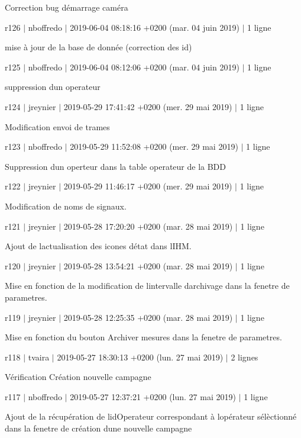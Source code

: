 Correction bug démarrage caméra

r126 $\vert$ nboffredo $\vert$ 2019-\/06-\/04 08\+:18\+:16 +0200 (mar. 04 juin 2019) $\vert$ 1 ligne

mise à jour de la base de donnée (correction des id)

r125 $\vert$ nboffredo $\vert$ 2019-\/06-\/04 08\+:12\+:06 +0200 (mar. 04 juin 2019) $\vert$ 1 ligne

suppression d\textquotesingle{}un operateur

r124 $\vert$ jreynier $\vert$ 2019-\/05-\/29 17\+:41\+:42 +0200 (mer. 29 mai 2019) $\vert$ 1 ligne

Modification envoi de trames

r123 $\vert$ nboffredo $\vert$ 2019-\/05-\/29 11\+:52\+:08 +0200 (mer. 29 mai 2019) $\vert$ 1 ligne

Suppression d\textquotesingle{}un operteur dans la table operateur de la B\+DD

r122 $\vert$ jreynier $\vert$ 2019-\/05-\/29 11\+:46\+:17 +0200 (mer. 29 mai 2019) $\vert$ 1 ligne

Modification de noms de signaux.

r121 $\vert$ jreynier $\vert$ 2019-\/05-\/28 17\+:20\+:20 +0200 (mar. 28 mai 2019) $\vert$ 1 ligne

Ajout de l\textquotesingle{}actualisation des icones d\textquotesingle{}état dans l\textquotesingle{}I\+HM.

r120 $\vert$ jreynier $\vert$ 2019-\/05-\/28 13\+:54\+:21 +0200 (mar. 28 mai 2019) $\vert$ 1 ligne

Mise en fonction de la modification de l\textquotesingle{}intervalle d\textquotesingle{}archivage dans la fenetre de parametres.

r119 $\vert$ jreynier $\vert$ 2019-\/05-\/28 12\+:25\+:35 +0200 (mar. 28 mai 2019) $\vert$ 1 ligne

Mise en fonction du bouton Archiver mesures dans la fenetre de parametres.

r118 $\vert$ tvaira $\vert$ 2019-\/05-\/27 18\+:30\+:13 +0200 (lun. 27 mai 2019) $\vert$ 2 lignes

Vérification Création nouvelle campagne

r117 $\vert$ nboffredo $\vert$ 2019-\/05-\/27 12\+:37\+:21 +0200 (lun. 27 mai 2019) $\vert$ 1 ligne

Ajout de la récupération de l\textquotesingle{}id\+Operateur correspondant à l\textquotesingle{}opérateur sélèctionné dans la fenetre de création d\textquotesingle{}une nouvelle campagne


